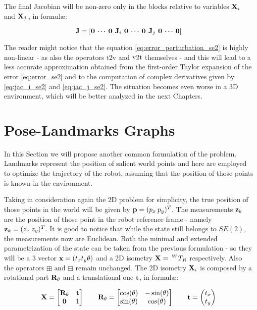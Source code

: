 \noindent The final Jacobian will be non-zero only in the blocks relative to variables $\mathbf{X}_i$ and $\mathbf{X}_j\,$, in formul\ae:

\begin{equation}
    \mathbf{J} = \left[\mathbf{0} \: \cdots \: \mathbf{0} \:\, \mathbf{J}_i \,\: \mathbf{0} \: \cdots \: \mathbf{0} \:\, \mathbf{J}_j \,\: \mathbf{0} \: \cdots \: \mathbf{0}\right]
    \label{eq:jac_se2}
\end{equation}

The reader might notice that the equation \ref{eq:error_perturbation_se2} is highly non-linear - as also the operators $\text{t2v}$ and $\v2t$ themselves - and this will lead to a less accurate approximation obtained from the first-order Taylor expansion of the error \ref{eq:error_se2} and to the computation of complex derivatives given by \ref{eq:jac_i_se2} and \ref{eq:jac_j_se2}. The situation becomes even worse in a 3D environment, which will be better analyzed in the next Chapters. 

\section{Pose-Landmarks Graphs}\label{sec:pose_land_graph}
In this Section we will propose another common formulation of the problem. Landmarks represent the position of salient world points and here are employed to optimize the trajectory of the robot, assuming that the position of those points is known in the environment. 

Taking in consideration again the 2D problem for simplicity, the true position of those points in the world will be given by $\mathbf{p} = (p_x\: p_y)^T$. The measurements $\mathbf{z}_k$ are the position of those point in the robot reference frame - namely $\mathbf{z}_k = (z_x\:z_y)^T$. It is good to notice that while the state still belongs to $SE(2)$, the measurements now are Euclidean. Both the minimal and extended parametrization of the state can be taken from the previous formulation - so they will be a $3$ vector $\mathbf{x} = (t_x t_y \theta)$ and a 2D isometry $\mathbf{X} =\: ^{W}T_{R}$ respectively. Also the operators $\boxplus$ and $\boxminus$ remain unchanged. The 2D isometry $\mathbf{X}_i$ is composed by a rotational part $\mathbf{R}_{\theta}$ and a translational one $\mathbf{t}$, in formul\ae:

\begin{align}
    \mathbf{X} = 
        \begin{bmatrix}
            \mathbf{R}_{\theta} & \mathbf{t} \\
            \mathbf{0} & 1
        \end{bmatrix} 
    \qquad
    \mathbf{R}_{\theta} = 
        \begin{bmatrix}
            \cos(\theta) & -\sin(\theta) \\
            \sin(\theta) & \cos(\theta)
        \end{bmatrix}
    \qquad
    \mathbf{t} = 
        \begin{pmatrix}
            t_x \\
            t_y
        \end{pmatrix}
    \label{eq:2d_isometry}
\end{align}

